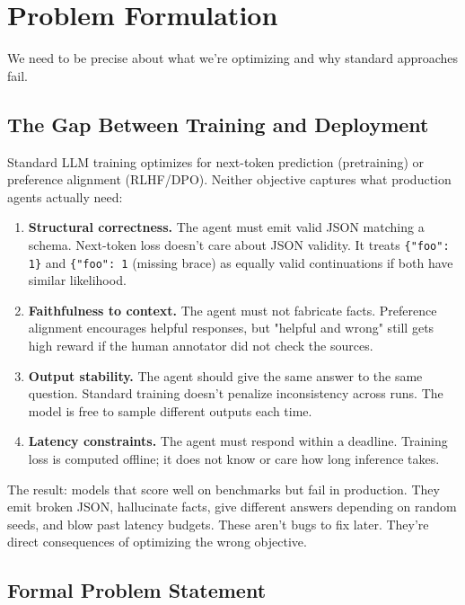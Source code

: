 \documentclass[11pt]{article}
\begin{document}
\section{Problem Formulation}
\label{sec:problem}

We need to be precise about what we're optimizing and why standard approaches fail.

\subsection{The Gap Between Training and Deployment}

Standard LLM training optimizes for next-token prediction (pretraining) or preference alignment (RLHF/DPO).
Neither objective captures what production agents actually need:

\begin{enumerate}[leftmargin=12pt]
    \item \textbf{Structural correctness.} The agent must emit valid JSON matching a schema.  Next-token loss doesn't care about JSON validity.  It treats \texttt{\{"foo": 1\}} and \texttt{\{"foo": 1} (missing brace) as equally valid continuations if both have similar likelihood.

    \item \textbf{Faithfulness to context.} The agent must not fabricate facts.  Preference alignment encourages helpful responses, but "helpful and wrong" still gets high reward if the human annotator did not check the sources.

    \item \textbf{Output stability.} The agent should give the same answer to the same question.  Standard training doesn't penalize inconsistency across runs.  The model is free to sample different outputs each time.

    \item \textbf{Latency constraints.} The agent must respond within a deadline.  Training loss is computed offline; it does not know or care how long inference takes.
\end{enumerate}

The result: models that score well on benchmarks but fail in production.
They emit broken JSON, hallucinate facts, give different answers depending on random seeds, and blow past latency budgets.
These aren't bugs to fix later.  They're direct consequences of optimizing the wrong objective.

\subsection{Formal Problem Statement}
\end{document}
